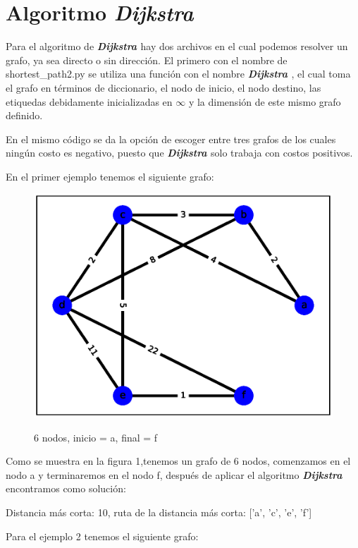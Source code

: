 \documentclass{report}
\newcommand{\dij}{{\bfseries {\textit{Dijkstra }}}}
\begin{document}
\tableofcontents
\newpage
\section{Algoritmo \dij}
Para el algoritmo de \dij hay dos archivos en el cual podemos resolver un grafo, ya sea directo o sin dirección. El primero con el nombre de shortest\_path2.py se utiliza una función con el nombre \dij, el cual toma el grafo en términos de diccionario, el nodo de inicio, el nodo destino, las etiquedas debidamente inicializadas en $\infty$ y la dimensión de este mismo grafo definido.

En el mismo código se da la opción de escoger entre tres grafos de los cuales ningún costo es negativo, puesto que \dij solo trabaja con costos positivos.

En el primer ejemplo tenemos el siguiente grafo:
\begin{figure}[ht]
    \centering
    \includegraphics[scale = 0.4]{ejemplo1.eps}
    \label{figura1}
    \caption{6 nodos, inicio = a, final = f}
\end{figure}

Como se muestra en la figura 1,tenemos un grafo de 6 nodos, comenzamos en el nodo a y terminaremos en el nodo f, después de aplicar el algoritmo \dij encontramos como solución:
\begin{center}
    Distancia más corta:
    10,
    ruta de la distancia más corta:
    ['a', 'c', 'e', 'f']
\end{center}

Para el ejemplo 2 tenemos el siguiente grafo:
\end{document}

